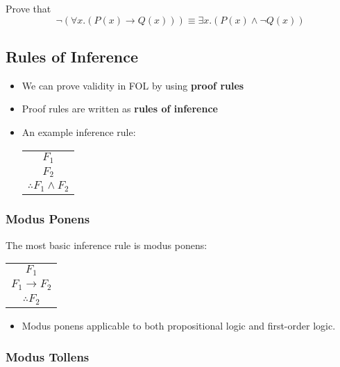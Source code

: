 \documentclass[8pt]{scrreprt}
\begin{document}
\begin{landscape}
\begin{multicols*}{3}
\begin{example}
	Prove that \[
		\neg(\forall x.(P(x)\rightarrow Q(x))) \equiv \exists x.(P(x)\land \neg Q(x))
	\]
\end{example}

\subsection{Rules of Inference}

\begin{itemize}
	\item We can prove validity in FOL by using \textbf{proof rules}
	\item Proof rules are written as \textbf{rules of inference}
	\item An example inference rule:

	      \begin{center}
		      \begin{tabular}{c}
			      $F_1$                     \\
			      $F_2$                     \\
			      \hline
			      $\therefore F_1\land F_2$ \\
		      \end{tabular}
	      \end{center}
\end{itemize}

\subsubsection{Modus Ponens}

The most basic inference rule is modus ponens:

\begin{center}
	\begin{tabular}{c}
		$F_1$                \\
		$F_1\rightarrow F_2$ \\
		\hline
		$\therefore F_2$     \\
	\end{tabular}
\end{center}

\begin{itemize}
	\item Modus ponens applicable to both propositional logic and first-order logic.
\end{itemize}

\subsubsection{Modus Tollens}


\end{multicols*}
\end{landscape}
\end{document}

